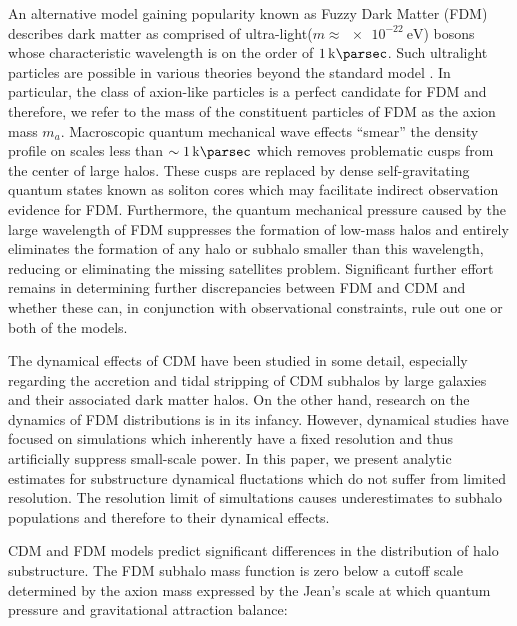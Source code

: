 \documentclass[usenatbib]{mnras}
\newcommand{\poweV}[1]{\SI{e#1}{\electronvolt}}
\begin{document}
\par
	An alternative model gaining popularity known as Fuzzy Dark Matter (FDM) describes dark matter as comprised of ultra-light($m \approx \poweV{-22}$) bosons whose characteristic wavelength is on the order of $\SI{1}{\kilo\parsec}$. Such ultralight particles are possible in various theories beyond the standard model \citep{axion_cosmology}. In particular, the class of axion-like particles is a perfect candidate for FDM and therefore, we refer to the mass of the constituent particles of FDM as the axion mass $m_a$. Macroscopic quantum mechanical wave effects “smear” the density profile on scales less than $\sim \SI{1}{\kilo\parsec}$ which removes problematic cusps from the center of large halos. These cusps are replaced by dense self-gravitating quantum states known as soliton cores which may facilitate indirect observation evidence for FDM. Furthermore, the quantum mechanical pressure caused by the large wavelength of FDM suppresses the formation of low-mass halos and entirely eliminates the formation of any halo or subhalo smaller than this wavelength, reducing or eliminating the missing satellites problem. Significant further effort remains in determining further discrepancies between FDM and CDM and whether these can, in conjunction with observational constraints, rule out one or both of the models.
 
\par
        The dynamical effects of CDM have been studied in some detail, especially regarding the accretion and tidal stripping of CDM subhalos by large galaxies and their associated dark matter halos. On the other hand, research on the dynamics of FDM distributions is in its infancy. However, dynamical studies have focused on simulations which inherently have a fixed resolution and thus artificially suppress small-scale power. In this paper, we present analytic estimates for substructure dynamical fluctations which do not suffer from limited resolution. The resolution limit of simultations causes underestimates to subhalo populations and therefore to their dynamical effects. 
\par 
	CDM and FDM models predict significant differences in the distribution of halo substructure. The FDM subhalo mass function is zero below a cutoff scale determined by the axion mass expressed by the Jean’s scale at which quantum pressure and gravitational attraction balance:
\setlength{\belowdisplayskip}{4pt} \setlength{\belowdisplayshortskip}{4pt}
\setlength{\abovedisplayskip}{4pt} \setlength{\abovedisplayshortskip}{4pt}
\end{document}
